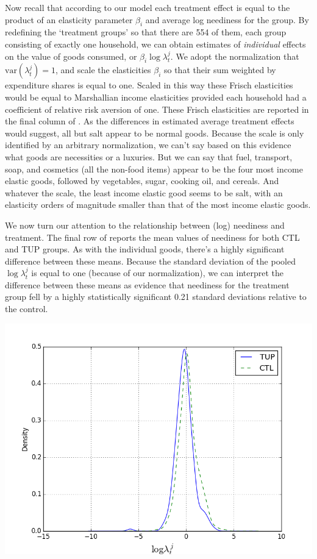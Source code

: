 \documentclass[12pt,letterpaper]{article}
\begin{document}
Now recall that according to our model each treatment effect is equal
to the product of an elasticity parameter \(\beta_i\) and average log
neediness for the group.  By redefining the `treatment groups' so that
there are 554 of them, each group consisting of exactly one household,
we can obtain estimates of \emph{individual} effects on the value of goods
consumed, or \(\beta_i\log\lambda^j_t\).  We adopt the normalization
that \(\mbox{var}(\lambda^j_t)=1\), and scale the elasticities \(\beta_i\)
so that their sum weighted by expenditure shares is equal to one.
Scaled in this way these Frisch elasticities would be equal to
Marshallian income elasticities provided each household had a
coefficient of relative risk aversion of one.  These Frisch
elasticities are reported in the final column of .
As the differences in estimated average treatment effects would
suggest, all but salt appear to be normal goods.  Because the scale is
only identified by an arbitrary normalization, we can't say based on
this evidence what goods are necessities or a luxuries.  But we can
say that fuel, transport, soap, and cosmetics (all the non-food items)
appear to be the four most income elastic goods, followed by
vegetables, sugar, cooking oil, and cereals.  And whatever the scale,
the least income elastic good seems to be salt, with an elasticity
orders of magnitude smaller than that of the most income elastic goods.

We now turn our attention to the relationship between (log) neediness
and treatment.  The final row of  reports the mean
values of neediness for both CTL and TUP groups.  As with the
individual goods, there's a highly significant difference between
these means.  Because the standard deviation of the pooled
\(\log\lambda^j_t\) is equal to one (because of our normalization), we
can interpret the difference between these means as evidence that
neediness for the treatment group fell by a highly statistically
significant 0.21 standard deviations relative to the control.

\includegraphics[width=.9\linewidth]{../analysis/figures/loglambda_distribution_by_treatment.png}
\end{document}
